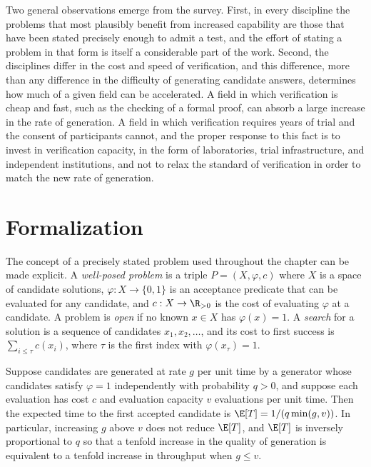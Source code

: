 Two general observations emerge from the survey. First, in every discipline the problems that most plausibly benefit from increased capability are those that have been stated precisely enough to admit a test, and the effort of stating a problem in that form is itself a considerable part of the work. Second, the disciplines differ in the cost and speed of verification, and this difference, more than any difference in the difficulty of generating candidate answers, determines how much of a given field can be accelerated. A field in which verification is cheap and fast, such as the checking of a formal proof, can absorb a large increase in the rate of generation. A field in which verification requires years of trial and the consent of participants cannot, and the proper response to this fact is to invest in verification capacity, in the form of laboratories, trial infrastructure, and independent institutions, and not to relax the standard of verification in order to match the new rate of generation.

\section*{Formalization}

The concept of a precisely stated problem used throughout the chapter can be made explicit. A \emph{well-posed problem} is a triple $P=(X,\varphi,c)$ where $X$ is a space of candidate solutions, $\varphi:X\to\{0,1\}$ is an acceptance predicate that can be evaluated for any candidate, and $c:X\to\R_{>0}$ is the cost of evaluating $\varphi$ at a candidate. A problem is \emph{open} if no known $x\in X$ has $\varphi(x)=1$. A \emph{search} for a solution is a sequence of candidates $x_1,x_2,\dots$, and its cost to first success is $\sum_{i\le\tau}c(x_i)$, where $\tau$ is the first index with $\varphi(x_\tau)=1$.

\begin{proposition}
Suppose candidates are generated at rate $g$ per unit time by a generator whose candidates satisfy $\varphi=1$ independently with probability $q>0$, and suppose each evaluation has cost $c$ and evaluation capacity $v$ evaluations per unit time. Then the expected time to the first accepted candidate is $\E[T]=1/(q\min(g,v))$. In particular, increasing $g$ above $v$ does not reduce $\E[T]$, and $\E[T]$ is inversely proportional to $q$ so that a tenfold increase in the quality of generation is equivalent to a tenfold increase in throughput when $g\le v$.
\end{proposition}

